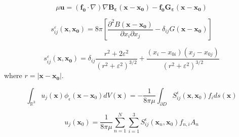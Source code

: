 \begin{equation}
    \mu \mathbf{u} = (\mathbf{f_0}\cdot\nabla)\nabla\mathbf{B_\varepsilon}(\mathbf{x}-\mathbf{x_0})-\mathbf{f_0}\mathbf{G_\varepsilon}(\mathbf{x}-\mathbf{x_0})
\end{equation}

\begin{equation}
\label{eq:regstokeslet1}
    s_{ij}^\varepsilon(\mathbf{x}, \mathbf{x_0}) = 8\pi\left[ \frac{\partial^2 B(\mathbf{x} -\mathbf{x_0})}{\partial x_i \partial x_j} - \delta_{ij}  G(\mathbf{x} -\mathbf{x_0})\right]
\end{equation}

\begin{equation}
\label{eq:regstokeslet2}
    s_{ij}^\varepsilon(\mathbf{x}, \mathbf{x_0})   = \delta_{ij} \frac{r^2+2\varepsilon^2}{\left( r^2 + \varepsilon^2 \right)^{3/2}} + \frac{(x_i-x_{0i})(x_j-x_{0j})}{\left( r^2 + \varepsilon^2 \right)^{3/2}}
\end{equation}
where $r=|\mathbf{x}-\mathbf{x_0}|$. 

\begin{equation}
    \int_{\mathbb{R}^{3}} u_{j}(\mathbf{x}) \phi_{\epsilon}\left(\mathbf{x}-\mathbf{x}_{0}\right) d V(\mathbf{x})=-\frac{1}{8 \pi \mu} \int_{\partial D} S_{i j}^{\epsilon}\left(\mathbf{x}, \mathbf{x}_{0}\right) f_{i} d s(\mathbf{x})
\end{equation}


\begin{equation}
\label{eq:Stokesletsum}
    u_{j}\left(\mathbf{x}_{0}\right)=\frac{1}{8 \pi \mu} \sum_{n=1}^{N} \sum_{i=1}^{3} S_{i j}^{\epsilon}\left(\mathbf{x}_{n}, \mathbf{x}_{0}\right) f_{n, i} A_{n}
\end{equation}